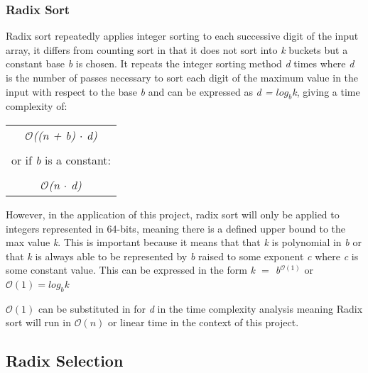 \documentclass[12pt]{article}
\begin{document}
	\subsubsection{Radix Sort}
	Radix sort repeatedly applies integer sorting to each successive digit of the input array, it differs from counting sort in that it does not sort into \textit{k} buckets but a constant base \textit{b} is chosen. It repeats the integer sorting method \textit{d} times where \textit{d} is the number of passes necessary to sort each digit of the maximum value in the input with respect to the base \textit{b} and can be expressed as \textit{d = $log_b$k}, giving a time complexity of:
	\begin{table}[!h]
		\begin{center}
			\begin{tabular}{c}

	 $\mathcal{O}$\textit{((n + b) $\cdot$ d)}
 \\ \\
	or if \textit{b} is a constant:
\\	\\
	$\mathcal{O}$\textit{(n $\cdot$ d)} 
			\end{tabular}
				
			\end{center}
		\end{table}
			
	However, in the application of this project, radix sort will only be applied to integers represented in 64-bits, meaning there is a defined upper bound to the max value \textit{k}. This is important because it means that that \textit{k} is polynomial in \textit{b} or that \textit{k} is always able to be represented by \textit{b} raised to some exponent \textit{c} where \textit{c} is some constant value. This can be expressed in the form \textit{k $=$ b$^{\mathcal{O}(1)}$} or \textit{$\mathcal{O}(1) = log_b$k}
	\par
	$\mathcal{O}(1)$ can be substituted in for \textit{d} in the time complexity analysis meaning Radix sort will run in $\mathcal{O}(n)$ or linear time in the context of this project.
	\pagebreak
	\subsection{Radix Selection}
	
\end{document}
